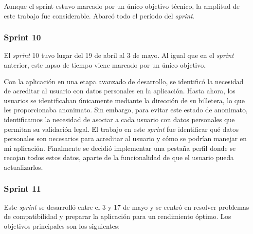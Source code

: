 Aunque el sprint estuvo marcado por un único objetivo técnico, la amplitud de este trabajo fue considerable. Abarcó todo el período del \textit{sprint}.


\subsubsection{Sprint 10}

El \textit{sprint} 10 tuvo lugar del 19 de abril al 3 de mayo. Al igual que en el \textit{sprint} anterior, este lapso de tiempo viene marcado por un único objetivo.

Con la aplicación en una etapa avanzado de desarrollo, se identificó la necesidad de acreditar al usuario con datos personales en la aplicación. Hasta ahora, los usuarios se identificaban únicamente mediante la dirección de su billetera, lo que les proporcionaba anonimato. Sin embargo, para evitar este estado de anonimato, identificamos la necesidad de asociar a cada usuario con datos personales que permitan su validación legal.
El trabajo en este \textit{sprint} fue identificar qué datos personales son necesarios para acreditar al usuario y cómo se podrían manejar en mi aplicación.
Finalmente se decidió implementar una pestaña perfil donde se recojan todos estos datos, aparte de la funcionalidad de que el usuario pueda actualizarlos.


\subsubsection{Sprint 11}

Este \textit{sprint} se desarrolló entre el 3 y 17 de mayo y se centró en resolver problemas de compatibilidad y preparar la aplicación para un rendimiento óptimo. 
Los objetivos principales son los siguientes:

